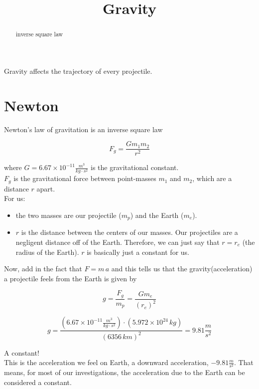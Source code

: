 \documentclass{ximera}
\title{Gravity}
\begin{document}
\begin{abstract}
inverse square law
\end{abstract}
\maketitle




Gravity affects the trajectory of every projectile.




\section{Newton}

Newton's law of gravitation is an inverse square law

\[ F_g = \frac{G m_1 m_2}{r^2}    \]




where $G = 6.67 \times 10^{-11} \frac{m^3}{kg \cdot s^2}$ is the gravitational constant. \\


$F_g$ is the gravitational force between point-masses $m_1$ and $m_2$, which are a distance $r$ apart. \\


For us:
\begin{itemize}
\item the two masses are our projectile ($m_p$) and the Earth ($m_e$).
\item $r$ is the distance between the centers of our masses. Our projectiles are a negligent distance off of the Earth.  Therefore, we can just say that $r = r_e$ (the radius of the Earth).  $r$ is basically just a constant for us.
\end{itemize}



Now, add in the fact that $F = m \, a$ and this tells us that the gravity(acceleration) a projectile feels from the Earth is given by


\[ g = \frac{F_g}{m_p}  = \frac{G m_e}{(r_e)^2}    \]


\[ g = \frac{(6.67 \times 10^{-11} \frac{m^3}{kg \cdot s^2}) \cdot (5.972 \times 10^{24} \, kg)}{(6356 \, km)^2} = 9.81 \frac{m}{s^2}   \]


A constant! \\

This is the acceleration we feel on Earth, a downward acceleration, $-9.81 \frac{m}{s^2}$.   That means, for most of our investigations, the acceleration due to the Earth can be considered a constant.
\end{document}
